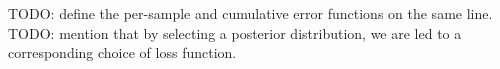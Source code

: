 TODO: define the per-sample and cumulative error functions on the same line.
TODO: mention that by selecting a posterior distribution, we are led to a
corresponding choice of loss function.
%
%
%
%

